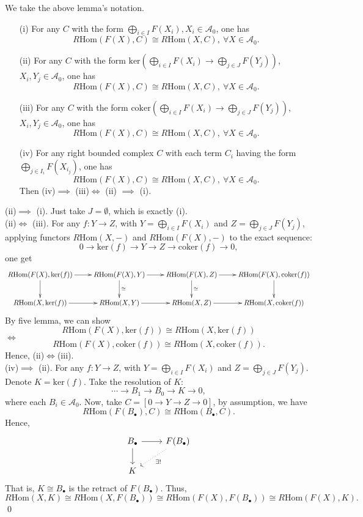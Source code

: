 \documentclass[UTF8,12,a4paper]{ctexart}
\theoremstyle{definition}
\begin{document}
\newpage
\lem \label{equivalence}
We take the above lemma's notation.
\begin{itemize}
	\item [(i)] For any $C$ with the form $\bigoplus_{i\in I} F(X_i),  X_i\in\mathcal{A}_0$, one has
	$$
	R\text{Hom}(F(X),C)\cong R\text{Hom}(X,C),\ \forall X\in\mathcal{A}_0.
	$$
	\item [(ii)]For any $C$ with the form $\text{ker}(\bigoplus_{i\in I} F(X_i)\rightarrow \bigoplus_{j\in J} F(Y_j))$, $X_i, Y_j\in \mathcal{A}_0$, one has
	$$
		R\text{Hom}(F(X),C)\cong R\text{Hom}(X,C),\ \forall X\in\mathcal{A}_0.
	$$
	\item [(iii)]
	For any $C$ with the form $\text{coker}(\bigoplus_{i\in I} F(X_i)\rightarrow \bigoplus_{j\in J} F(Y_j))$, $X_i, Y_j\in \mathcal{A}_0$, one has
	$$
	R\text{Hom}(F(X),C)\cong R\text{Hom}(X,C),\ \forall X\in\mathcal{A}_0.
	$$
	\item [(iv)] For any right bounded complex $C$ with each term $C_i$ having the form $\bigoplus_{j\in I_i} F(X_{i_j})$, one has
	$$
	R\text{Hom}(F(X),C)\cong R\text{Hom}(X,C),\ \forall X\in\mathcal{A}_0.
	$$
	Then (iv)$\implies$ (iii)$\iff$ (ii) $\implies$ (i).
\end{itemize}
\pf
(ii)$\implies$ (i). Just take $J=\emptyset$, which is exactly (i).\\
(ii)$\iff$ (iii). For any $f: Y\rightarrow Z$, with $Y=\bigoplus_{i\in I} F(X_i)$ and $Z=\bigoplus_{j\in J} F(Y_j)$, applying functors $R\text{Hom}(X,-)$ and $R\text{Hom}(F(X),-)$ to the exact sequence:
$$
0\rightarrow \text{ker}(f)\rightarrow Y\rightarrow Z\rightarrow \text{coker}(f)\rightarrow 0,
$$
one get 
\begin{equation*}
\xymatrix{
	R\text{Hom}(F(X),\text{ker}(f)) \ar[r]\ar[d] &R\text{Hom}(F(X),Y)\ar[d]^\cong\ar[r]&R\text{Hom}(F(X),Z)\ar[d]^\cong\ar[r]&R\text{Hom}(F(X),\text{coker}(f))\ar[d] \\
	R\text{Hom}(X,\text{ker}(f))\ar[r] &R\text{Hom}(X,Y)\ar[r]&R\text{Hom}(X,Z)\ar[r]&R\text{Hom}(X,\text{coker}(f))
}
\end{equation*}
By five lemma, we can show 
$$
R\text{Hom}(F(X),\text{ker}(f))\cong R\text{Hom}(X,\text{ker}(f))
$$
$\iff$
$$
R\text{Hom}(F(X),\text{coker}(f))\cong R\text{Hom}(X,\text{coker}(f)).
$$
Hence, (ii)$\iff$(iii).\\
(iv)$\implies$ (ii). For any $f: Y\rightarrow Z$, with $Y=\bigoplus_{i\in I} F(X_i)$ and $Z=\bigoplus_{j\in J} F(Y_j)$. Denote $K=\text{ker}(f)$. Take the resolution of $K$:
$$
\cdots\rightarrow B_1\rightarrow B_0\rightarrow K\rightarrow 0,
$$
where each $B_i\in\mathcal{A}_0$. Now, take $C=[0\rightarrow Y\rightarrow Z\rightarrow 0]$, by assumption, we have
$$
R\text{Hom}(F(B_{\bullet}),C)\cong R\text{Hom}(B_{\bullet},C).
$$
Hence,
$$
\begin{tikzcd}
B_{\bullet} \arrow[d] \arrow[r] & F(B_{\bullet}) \arrow[ld, "\exists !", dotted] \\
K                               &                                               
\end{tikzcd}
$$
That is, $K\cong B_\bullet$ is the retract of $F(B_\bullet).$
Thus, 
$$
R\text{Hom}(X,K)\cong R\text{Hom}(X,F(B_\bullet))\cong R\text{Hom}(F(X),F(B_\bullet))\cong R\text{Hom}(F(X),K).
$$
\qed
\end{document}
